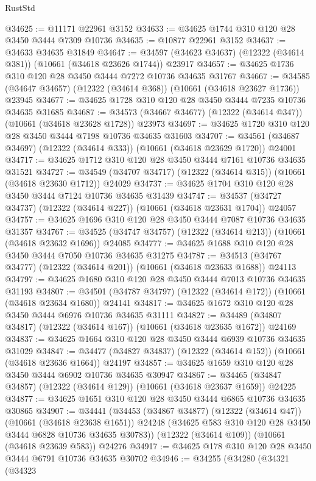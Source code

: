 \begin{lexlean}{RustStd}
\begin{coremodule}
@34625 := @11171 @22961 @3152
@34633 := @34625 @1744 @310 @120 @28 @3450 @3444 @7309 @10736
@34635 := @10877 @22961 @3152
@34637 := @34633 @34635 @31849
@34647 := @34597 (@34623 @34637) (@12322 (@34614 @381)) (@10661 (@34618 @23626 @1744)) @23917
@34657 := @34625 @1736 @310 @120 @28 @3450 @3444 @7272 @10736 @34635 @31767
@34667 := @34585 (@34647 @34657) (@12322 (@34614 @368)) (@10661 (@34618 @23627 @1736)) @23945
@34677 := @34625 @1728 @310 @120 @28 @3450 @3444 @7235 @10736 @34635 @31685
@34687 := @34573 (@34667 @34677) (@12322 (@34614 @347)) (@10661 (@34618 @23628 @1728)) @23973
@34697 := @34625 @1720 @310 @120 @28 @3450 @3444 @7198 @10736 @34635 @31603
@34707 := @34561 (@34687 @34697) (@12322 (@34614 @333)) (@10661 (@34618 @23629 @1720)) @24001
@34717 := @34625 @1712 @310 @120 @28 @3450 @3444 @7161 @10736 @34635 @31521
@34727 := @34549 (@34707 @34717) (@12322 (@34614 @315)) (@10661 (@34618 @23630 @1712)) @24029
@34737 := @34625 @1704 @310 @120 @28 @3450 @3444 @7124 @10736 @34635 @31439
@34747 := @34537 (@34727 @34737) (@12322 (@34614 @227)) (@10661 (@34618 @23631 @1704)) @24057
@34757 := @34625 @1696 @310 @120 @28 @3450 @3444 @7087 @10736 @34635 @31357
@34767 := @34525 (@34747 @34757) (@12322 (@34614 @213)) (@10661 (@34618 @23632 @1696)) @24085
@34777 := @34625 @1688 @310 @120 @28 @3450 @3444 @7050 @10736 @34635 @31275
@34787 := @34513 (@34767 @34777) (@12322 (@34614 @201)) (@10661 (@34618 @23633 @1688)) @24113
@34797 := @34625 @1680 @310 @120 @28 @3450 @3444 @7013 @10736 @34635 @31193
@34807 := @34501 (@34787 @34797) (@12322 (@34614 @172)) (@10661 (@34618 @23634 @1680)) @24141
@34817 := @34625 @1672 @310 @120 @28 @3450 @3444 @6976 @10736 @34635 @31111
@34827 := @34489 (@34807 @34817) (@12322 (@34614 @167)) (@10661 (@34618 @23635 @1672)) @24169
@34837 := @34625 @1664 @310 @120 @28 @3450 @3444 @6939 @10736 @34635 @31029
@34847 := @34477 (@34827 @34837) (@12322 (@34614 @152)) (@10661 (@34618 @23636 @1664)) @24197
@34857 := @34625 @1659 @310 @120 @28 @3450 @3444 @6902 @10736 @34635 @30947
@34867 := @34465 (@34847 @34857) (@12322 (@34614 @129)) (@10661 (@34618 @23637 @1659)) @24225
@34877 := @34625 @1651 @310 @120 @28 @3450 @3444 @6865 @10736 @34635 @30865
@34907 := @34441
    (@34453
      (@34867 @34877)
      (@12322 (@34614 @47))
      (@10661 (@34618 @23638 @1651))
      @24248
      (@34625 @583 @310 @120 @28 @3450 @3444 @6828 @10736 @34635 @30783))
    (@12322 (@34614 @109))
    (@10661 (@34618 @23639 @583))
    @24276
@34917 := @34625 @178 @310 @120 @28 @3450 @3444 @6791 @10736 @34635 @30702
@34946 := @34255
    (@34280
      (@34321
        (@34323

\end{coremodule}
\end{lexlean}
